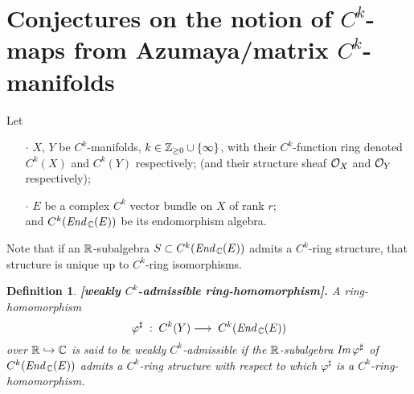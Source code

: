 \documentclass[11pt]{article}
\numberwithin{equation}{subsection}
\newtheorem{sdefinition}[stheorem]{Definition}
\newcommand{\End}{\mbox{\it End}\,}
\newcommand{\Image}{\mbox{\it Im}\,}
\begin{document}
\newpage

\section{Conjectures on the notion of $C^k$-maps from Azumaya/matrix $C^k$-manifolds}

Let
 \begin{itemize}
  \item[\LARGE $\cdot$]
   $X$, $Y$ be $C^k$-manifolds, $k\in {\Bbb Z}_{\ge 0}\cup\{\infty\}$,
    with their $C^k$-function ring denoted $C^k(X)$ and $C^k(Y)$ respectively;
   (and their structure sheaf ${\cal O}_X$ and ${\cal O}_Y$ respectively); 	
	
  \item[\LARGE $\cdot$]	
   $E$ be a complex $C^k$ vector bundle on $X$ of rank $r$; \\ and
   $C^k(\End_{\Bbb C}(E))$ be its endomorphism algebra.
 \end{itemize}

\bigskip

Note that
 if an ${\Bbb R}$-subalgebra $S\subset C^k(\End_{\Bbb C}(E))$
    admits a $C^k$-ring structure,
 that structure is unique up to $C^k$-ring isomorphisms.

\bigskip

\begin{sdefinition} {\bf [weakly $C^k$-admissible ring-homomorphism].} \rm
 A ring-homomorphism
  $$
   \varphi^{\sharp}\; :\; C^k(Y)\longrightarrow\;  C^k(\End_{\Bbb C}(E))
  $$
  over ${\Bbb R}\hookrightarrow{\Bbb C}$
  is said to be {\it weakly $C^k$-admissible}
 if the ${\Bbb R}$-subalgebra $\Image\varphi^{\sharp}$ of $C^k(\End_{\Bbb C}(E))$
  admits a $C^k$-ring structure
  with respect to which $\varphi^{\sharp}$ is a $C^k$-ring-homomorphism.
\end{sdefinition}

\medskip
\end{document}
